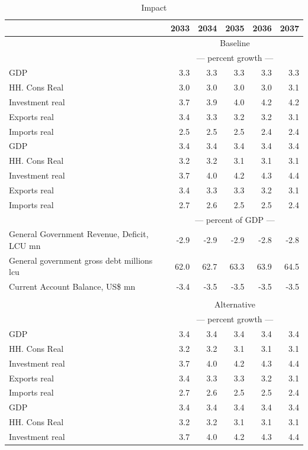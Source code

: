 \documentclass{article}
\begin{document}
 \begin{table}[ht]
\caption{Impact}
\begin{tabular}{lrrrrr}
\toprule
 & 2033 & 2034 & 2035 & 2036 & 2037 \\
\midrule
&\multicolumn{5}{c}{Baseline}           \\
&\multicolumn{5}{c}{--- percent growth ---}           \\
GDP & 3.3 & 3.3 & 3.3 & 3.3 & 3.3 \\
HH. Cons Real & 3.0 & 3.0 & 3.0 & 3.0 & 3.1 \\
Investment real & 3.7 & 3.9 & 4.0 & 4.2 & 4.2 \\
Exports real & 3.4 & 3.3 & 3.2 & 3.2 & 3.1 \\
Imports real & 2.5 & 2.5 & 2.5 & 2.4 & 2.4 \\
GDP & 3.4 & 3.4 & 3.4 & 3.4 & 3.4 \\
HH. Cons Real & 3.2 & 3.2 & 3.1 & 3.1 & 3.1 \\
Investment real & 3.7 & 4.0 & 4.2 & 4.3 & 4.4 \\
Exports real & 3.4 & 3.3 & 3.3 & 3.2 & 3.1 \\
Imports real & 2.7 & 2.6 & 2.5 & 2.5 & 2.4 \\
&\multicolumn{5}{c}{--- percent of GDP ---}           \\
General Government Revenue, Deficit, LCU mn & -2.9 & -2.9 & -2.9 & -2.8 & -2.8 \\
General government gross debt millions lcu & 62.0 & 62.7 & 63.3 & 63.9 & 64.5 \\
Current Account Balance, US\$ mn & -3.4 & -3.5 & -3.5 & -3.5 & -3.5 \\
&\multicolumn{5}{c}{  }           \\
&\multicolumn{5}{c}{Alternative}           \\
&\multicolumn{5}{c}{--- percent growth ---}           \\
GDP & 3.4 & 3.4 & 3.4 & 3.4 & 3.4 \\
HH. Cons Real & 3.2 & 3.2 & 3.1 & 3.1 & 3.1 \\
Investment real & 3.7 & 4.0 & 4.2 & 4.3 & 4.4 \\
Exports real & 3.4 & 3.3 & 3.3 & 3.2 & 3.1 \\
Imports real & 2.7 & 2.6 & 2.5 & 2.5 & 2.4 \\
GDP & 3.4 & 3.4 & 3.4 & 3.4 & 3.4 \\
HH. Cons Real & 3.2 & 3.2 & 3.1 & 3.1 & 3.1 \\
Investment real & 3.7 & 4.0 & 4.2 & 4.3 & 4.4 \\

\end{tabular}
\end{table}
\end{document}
